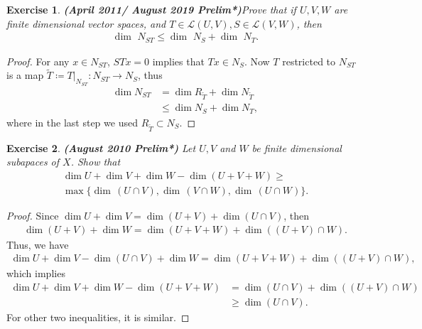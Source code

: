\documentclass[11pt]{book}
\newtheorem{exercise}{Exercise}[section]
\theoremstyle{definition}
\numberwithin{equation}{chapter}
\begin{document}
\medskip

\begin{exercise}{\bf (April 2011/ August 2019 Prelim*)}\label{April_2011_p1}
Prove that if $U,V,W$ are finite dimensional vector spaces, and $T\in\mathscr{L}(U,V), S\in\mathscr{L}(V,W)$, then
\begin{align*}
     \dim \,\, N_{ST} \leq  \dim \,\, N_S +  \dim \,\, N_T.
\end{align*}
\end{exercise}
\begin{proof}
For any $x \in N_{ST}$, $STx = 0$ implies that $Tx \in N_S$. Now $T$ restricted to $N_{ST}$ is a map $\widetilde{T} \coloneqq T|_{N_{ST}}: N_{ST} \to N_S$, thus
\begin{align*}
    \dim  N_{ST} & = \dim  R_{\widetilde{T}} + \dim  N_{\widetilde{T}} \\
    & \leq \dim  N_S + \dim  N_T,
\end{align*}
where in the last step we used $R_{\widetilde{T}} \subset N_S$.
\end{proof}

\medskip

\begin{exercise}{\bf (August 2010 Prelim*)}
Let $U, V$ and $W$ be finite dimensional subapaces of $X$. Show that
\begin{align*}
    \dim  U + \dim  V + \dim  W - \dim  (U + V + W) \geq \\
    \max \{\dim \,(U \cap V), \dim \,(V \cap W), \dim \,(U \cap W)\}.
\end{align*}
\end{exercise}
\begin{proof}
Since $\dim  U + \dim  V = \dim  (U + V) + \dim  (U \cap V)$, then 
\begin{align*}
    \dim  (U+V) + \dim  W = \dim  (U + V + W) + \dim  ((U+V) \cap W).
\end{align*}
Thus, we have
\begin{align*}
    \dim  U + \dim  V - \dim  (U \cap V) + \dim  W = \dim  (U + V + W) + \dim  ((U+V) \cap W),
\end{align*}
which implies
\begin{align*}
    \dim  U + \dim  V + \dim  W - \dim  (U + V + W) & = \dim  (U \cap V) + \dim  ((U+V) \cap W) \\
    & \geq \dim  (U \cap V).
\end{align*}
For other two inequalities, it is similar.
\end{proof}
\end{document}
